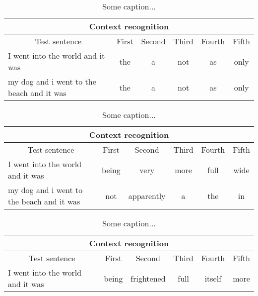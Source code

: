 {\vspace{-1cm}
\begin{table}[H]
\centering
\caption{Some caption...}
\begin{tabular}{ |p{}|c|c|c|c|c| }
	\hline
	\multicolumn{6}{|c|}{Context recognition} \\
	\hline
	\multicolumn{1}{|c|}{Test sentence} & First & Second & Third & Fourth & Fifth\\
	\hline
	I went into the world and it was & the & a & not & as & only \\
	\hline
	my dog and i went to the beach and it was & the & a & not & as & only \\
	\hline
\end{tabular}
\end{table}

\vspace{-1cm}
\begin{table}[H]
\centering
\caption{Some caption...}
\begin{tabular}{ |p{}|c|c|c|c|c| }
	\hline
	\multicolumn{6}{|c|}{Context recognition} \\
	\hline
	\multicolumn{1}{|c|}{Test sentence} & First & Second & Third & Fourth & Fifth\\
	\hline
	I went into the world and it was & being & very & more & full & wide \\
	\hline
	my dog and i went to the beach and it was & not & apparently & a & the & in \\
	\hline
\end{tabular}
\end{table}

\vspace{-1cm}
\begin{table}[H]
\centering
\caption{Some caption...}
\begin{tabular}{ |p{}|c|c|c|c|c| }
	\hline
	\multicolumn{6}{|c|}{Context recognition} \\
	\hline
	\multicolumn{1}{|c|}{Test sentence} & First & Second & Third & Fourth & Fifth\\
	\hline
	I went into the world and it was & being & frightened & full & itself & more \\
	\hline
\end{tabular}
\end{table}
}